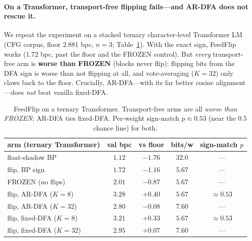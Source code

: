 \documentclass[11pt]{article}
\newcommand{\ARDFA}{\textsc{AR-DFA}}
\begin{document}
\paragraph{On a Transformer, transport-free flipping fails---and \ARDFA{} does not rescue it.} We repeat the experiment on a stacked ternary character-level Transformer LM (CFG corpus, floor $2.881$ bpc, $n{=}3$; Table~\ref{tab:flip-tf}). With the exact sign, FeedFlip works ($1.72$ bpc, past the floor and the FROZEN control). But \emph{every} transport-free arm is \textbf{worse than FROZEN} (blocks never flip): flipping bits from the DFA sign is worse than not flipping at all, and vote-averaging ($K{=}32$) only claws back to the floor. Crucially, \ARDFA{}---with its far better cosine alignment---does \emph{not} beat vanilla fixed-DFA.
\begin{table}[H]
\centering\footnotesize
\begin{tabular}{@{}lcccc@{}}
\toprule
arm (ternary Transformer) & val bpc & vs floor & bits/w & sign-match $p$ \\
\midrule
float-shadow BP & $\mathbf{1.12}$ & $-1.76$ & $32.0$ & --- \\
flip, BP sign & $\mathbf{1.72}$ & $-1.16$ & $5.67$ & --- \\
FROZEN (no flips) & $2.01$ & $-0.87$ & $5.67$ & --- \\
flip, \ARDFA{} ($K{=}8$) & $3.28$ & $+0.40$ & $5.67$ & $\approx0.53$ \\
flip, \ARDFA{} ($K{=}32$) & $2.80$ & $-0.08$ & $7.60$ & --- \\
flip, fixed-DFA ($K{=}8$) & $3.21$ & $+0.33$ & $5.67$ & $\approx0.53$ \\
flip, fixed-DFA ($K{=}32$) & $2.95$ & $+0.07$ & $7.60$ & --- \\
\bottomrule
\end{tabular}
\caption{FeedFlip on a ternary Transformer. Transport-free arms are all \emph{worse than FROZEN}; \ARDFA{} ties fixed-DFA. Per-weight sign-match $p\!\approx\!0.53$ (near the $0.5$ chance line) for both.}
\label{tab:flip-tf}
\end{table}
\end{document}
